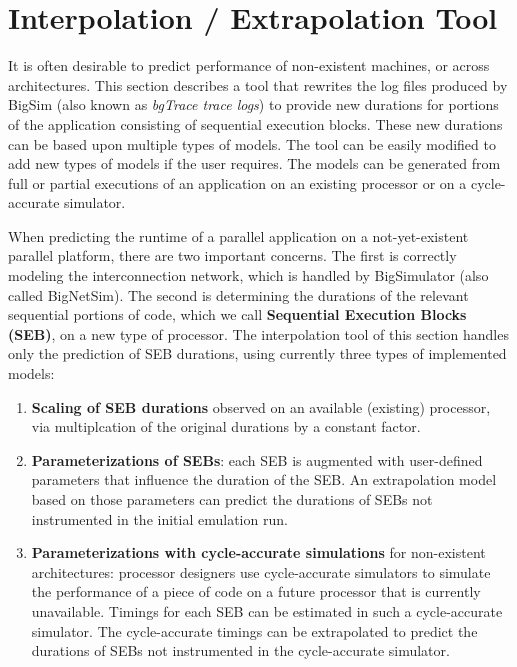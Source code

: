 \section{Interpolation / Extrapolation Tool\label{interpolation}}

It is often desirable to predict performance of non-existent machines, or across architectures.
This section describes a  tool that rewrites the  log files produced by BigSim (also known as {\em bgTrace trace
logs}) to provide new durations for portions of the application consisting of sequential execution blocks.
These new durations can be based upon multiple types of models.
The tool can be easily modified to add new types of models if the user requires.
The models can be generated from full or partial executions of an application on an existing processor or on a
cycle-accurate simulator. 


When predicting the runtime of a parallel application on a not-yet-existent
parallel platform, there are two important concerns. The first is correctly modeling the
interconnection network, which is handled by BigSimulator (also called BigNetSim). 
The second is determining the durations of the relevant sequential portions of code,
which we call \textbf{Sequential Execution Blocks (SEB)}, on a new type of processor.
The interpolation tool of this section handles only the prediction of SEB durations,
using currently three types of implemented models:

\begin{enumerate}
\item \textbf{Scaling of SEB durations} observed on an available (existing) processor, via multiplcation of
the original durations by a constant factor.
\item \textbf{Parameterizations of SEBs}: each SEB is augmented with user-defined parameters that
influence the duration of the SEB. An extrapolation model based on those parameters can
predict the durations of SEBs not instrumented in the initial emulation run.
\item \textbf{Parameterizations with cycle-accurate simulations} for non-existent architectures: 
processor designers use cycle-accurate simulators to simulate the performance of a piece of code on
a future processor that is currently unavailable.  Timings for each SEB can be estimated in such a cycle-accurate
simulator. The cycle-accurate timings can be extrapolated to predict the durations of SEBs not instrumented in the
cycle-accurate simulator.
\end{enumerate}


